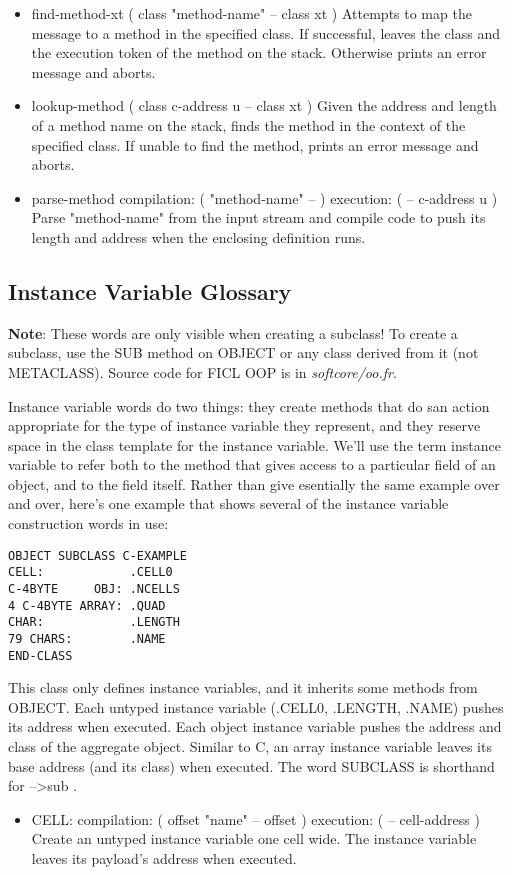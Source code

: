 \begin{;stlisting}[frame=single]
\begin{itemize}[noitemsep]
	\item find-method-xt ( class "method-name" -- class xt )\newline
	Attempts to map the message to a method in the specified class.
	If successful, leaves the class and the execution token of the
	method on the stack. Otherwise prints an error message and aborts.

	\item lookup-method ( class c-address u -- class xt )\newline
	Given the address and length of a method name on the stack,
	finds the method in the context of the specified class. If
	unable to find the method, prints an error message and aborts.

	\item parse-method compilation: ( "method-name" -- ) execution:
		( -- c-address u )\newline
	Parse "method-name" from the input stream and compile code to
	push its length and address when the enclosing definition runs.
\end{itemize}


\subsection{Instance Variable Glossary}
\textbf{Note}: These words are only visible when creating a subclass!
To create a subclass, use the SUB method on OBJECT or any class derived
from it (not METACLASS). Source code for FICL OOP is in
\textit{softcore/oo.fr}.

Instance variable words do two things: they create methods that do san
action appropriate for the type of instance variable they represent, and
they reserve space in the class template for the instance variable.
We'll use the term instance variable to refer both to the method that
gives access to a particular field of an object, and to the field
itself. Rather than give esentially the same example over and over,
here's one example that shows several of the instance variable
construction words in use:
\begin{lstlisting}[frame=single]
OBJECT SUBCLASS C-EXAMPLE
CELL:            .CELL0
C-4BYTE     OBJ: .NCELLS
4 C-4BYTE ARRAY: .QUAD
CHAR:            .LENGTH
79 CHARS:        .NAME
END-CLASS
\end{lstlisting}
This class only defines instance variables, and it inherits some methods
from OBJECT. Each untyped instance variable (.CELL0, .LENGTH, .NAME)
pushes its address when executed. Each object instance variable pushes
the address and class of the aggregate object. Similar to C, an array
instance variable leaves its base address (and its class) when executed.
The word SUBCLASS is shorthand for --\textgreater  sub .
\begin{itemize}[noitemsep]
	\item CELL: compilation: ( offset "name" -- offset ) execution:
		( -- cell-address )\newline
	Create an untyped instance variable one cell wide. The instance
	variable leaves its payload's address when executed.


\end{itemize}
\end{;stlisting}
